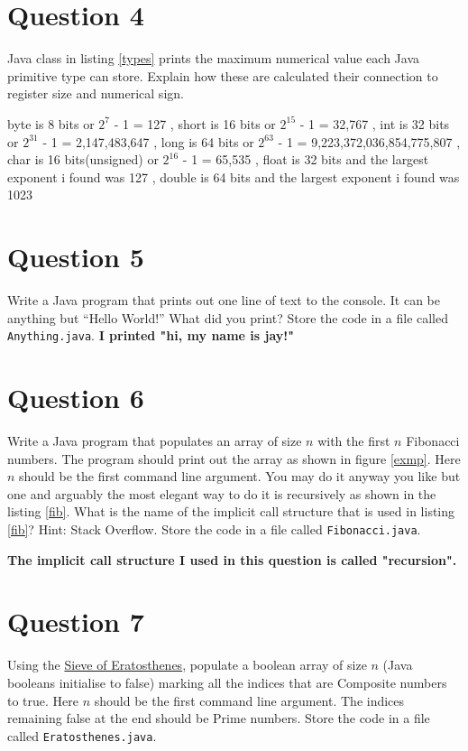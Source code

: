 \documentclass{article}
\newcommand\callit[1]{Store the code in a file called \texttt{#1}.}
\begin{document}
\section {Question 4} Java class in listing \ref{types} prints the maximum numerical
value each Java primitive type can store. Explain how these are
calculated \ie their connection to register size and numerical
sign.



  byte is 8 bits or $2^7$ - 1 = 127 , 
  short is 16 bits or $2^{15}$ - 1 = 32,767 ,
  int is 32 bits or $2^{31}$ - 1 = 2,147,483,647 ,
  long is 64 bits or $2^{63}$ - 1 = 9,223,372,036,854,775,807 ,
  char is 16 bits(unsigned) or $2^{16}$ - 1 = 65,535 ,
  float is 32 bits and the largest exponent i found was 127 ,
  double is 64 bits and the largest exponent i found was 1023

\section {Question 5} Write a Java program that prints out one line of text to the
console. It can be anything but ``Hello World!'' What did you
print? \callit{Anything.java} 
\textbf{I printed "hi, my name is jay!" }

\section {Question 6} Write a Java program that populates an array of size $n$ with the
first $n$ Fibonacci numbers. The program should print out the
array as shown in figure \ref{exmp}. Here $n$ should be the first
command line argument. You may do it anyway you like but one and
arguably the most elegant way to do it is recursively as shown in
the listing \ref{fib}. What is the name of the implicit call
structure that is used in listing \ref{fib}? Hint: Stack Overflow.
\callit{Fibonacci.java} 



  \textbf{The implicit call structure I used in this question is called "recursion". 
}

\section {Question 7} Using the
\href{https://en.wikipedia.org/wiki/Sieve_of_Eratosthenes}{Sieve
  of Eratosthenes}, populate a boolean array of size $n$ (Java
booleans initialise to false) marking all the indices that are
Composite numbers to true. Here $n$ should be the first command
line argument. The indices remaining false at the end should be
Prime numbers. \callit{Eratosthenes.java}
\end{document}
